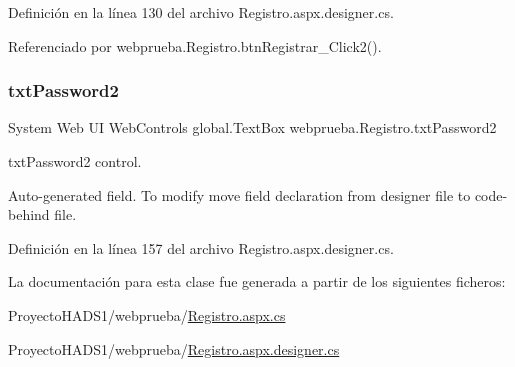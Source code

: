 Definición en la línea 130 del archivo Registro.\+aspx.\+designer.\+cs.



Referenciado por webprueba.\+Registro.\+btn\+Registrar\+\_\+\+Click2().

\mbox{\label{classwebprueba_1_1_registro_ad3b118ef8bbc387dc636f498bce77af4}} 
\subsubsection{\texorpdfstring{txtPassword2}{txtPassword2}}
{\footnotesize\ttfamily System Web UI Web\+Controls global.\+Text\+Box webprueba.\+Registro.\+txt\+Password2\hspace{0.3cm}{\ttfamily [protected]}}



txt\+Password2 control. 

Auto-\/generated field. To modify move field declaration from designer file to code-\/behind file. 

Definición en la línea 157 del archivo Registro.\+aspx.\+designer.\+cs.



La documentación para esta clase fue generada a partir de los siguientes ficheros\+:\begin{DoxyCompactItemize}
\item 
Proyecto\+H\+A\+D\+S1/webprueba/\mbox{\hyperlink{_proyecto_h_a_d_s1_2webprueba_2_registro_8aspx_8cs}{Registro.\+aspx.\+cs}}\item 
Proyecto\+H\+A\+D\+S1/webprueba/\mbox{\hyperlink{_proyecto_h_a_d_s1_2webprueba_2_registro_8aspx_8designer_8cs}{Registro.\+aspx.\+designer.\+cs}}\end{DoxyCompactItemize}
